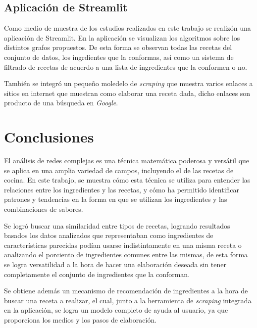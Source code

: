 \documentclass[a4paper]{article}
\begin{document}
\subsection{Aplicación de Streamlit}\label{sub:app}

Como medio de muestra de los estudios realizados en este trabajo se realizón
una aplicación de Streamlit. En la aplicación se visualizan los algoritmos sobre
los distintos grafos propuestos. De esta forma se observan todas las recetas del
conjunto de datos, los ingrdientes que la conformas, asi como un sistema de
filtrado de recetas de acuerdo a una lista de ingredientes que la conformen o no.

También se integró un pequeño moledelo de \emph{scraping} que muestra varios
enlaces a sitios en internet que muestran como elaborar una receta dada, dicho
enlaces son producto de una búsqueda en \emph{Google}.

\section{Conclusiones}\label{sec:conc}

El análisis de redes complejas es una técnica matemática poderosa y versátil que
se aplica en una amplia variedad de campos, incluyendo el de las recetas de
cocina. En este trabajo, se muestra cómo esta técnica se utiliza para entender
las relaciones entre los ingredientes y las recetas, y cómo ha permitido
identificar patrones y tendencias en la forma en que se utilizan los
ingredientes y las combinaciones de sabores.

Se logró buscar una similaridad entre tipos de recetas, logrando resultados
basados los datos analizados que representaban como ingredientes de
características parecidas podían usarse indistintamente en una misma receta o
analizando el porciento de ingredientes comunes entre las mismas, de esta forma
se logra versatilidad a la hora de hacer una elaboración deseada sin tener
completamente el conjunto de ingredientes que la conforman.

Se obtiene además un mecanismo de recomendación de ingredientes a la hora de
buscar una receta a realizar, el cual, junto a la herramienta de \emph{scraping}
integrada en la aplicación, se logra un modelo completo de ayuda al usuario, ya
que proporciona los medios y los pasos de elaboración.
\end{document}
